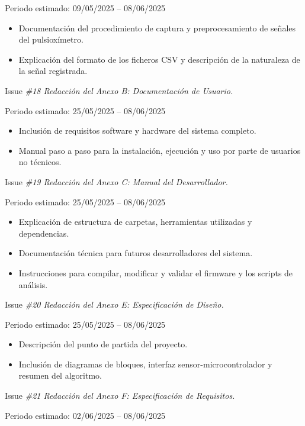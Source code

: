Periodo estimado: 09/05/2025 – 08/06/2025

\begin{itemize}
    \item Documentación del procedimiento de captura y preprocesamiento de señales del pulsioxímetro.
    \item Explicación del formato de los ficheros CSV y descripción de la naturaleza de la señal registrada.
\end{itemize}

Issue \textit{\#18 Redacción del Anexo B: Documentación de Usuario.}

Periodo estimado: 25/05/2025 – 08/06/2025

\begin{itemize}
    \item Inclusión de requisitos software y hardware del sistema completo.
    \item Manual paso a paso para la instalación, ejecución y uso por parte de usuarios no técnicos.
\end{itemize}

Issue \textit{\#19 Redacción del Anexo C: Manual del Desarrollador.}

Periodo estimado: 25/05/2025 – 08/06/2025

\begin{itemize}
    \item Explicación de estructura de carpetas, herramientas utilizadas y dependencias.
    \item Documentación técnica para futuros desarrolladores del sistema.
    \item Instrucciones para compilar, modificar y validar el firmware y los scripts de análisis.
\end{itemize}

Issue \textit{\#20 Redacción del Anexo E: Especificación de Diseño.}

Periodo estimado: 25/05/2025 – 08/06/2025

\begin{itemize}
    \item Descripción del punto de partida del proyecto.
    \item Inclusión de diagramas de bloques, interfaz sensor-microcontrolador y resumen del algoritmo.
\end{itemize}

Issue \textit{\#21 Redacción del Anexo F: Especificación de Requisitos.}

Periodo estimado: 02/06/2025 – 08/06/2025

